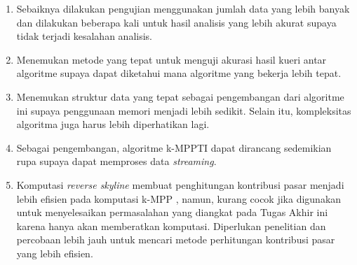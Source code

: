 \begin{enumerate}
	\item Sebaiknya dilakukan pengujian menggunakan jumlah data yang lebih banyak dan dilakukan beberapa kali untuk hasil analisis yang lebih akurat supaya tidak terjadi kesalahan analisis.
	\item Menemukan metode yang tepat untuk menguji akurasi hasil kueri antar algoritme supaya dapat diketahui mana algoritme yang bekerja lebih tepat.
	\item Menemukan struktur data yang tepat sebagai pengembangan dari algoritme ini supaya penggunaan memori menjadi lebih sedikit. Selain itu, kompleksitas algoritma juga harus lebih diperhatikan lagi.
	\item Sebagai pengembangan, algoritme k-MPPTI dapat dirancang sedemikian rupa supaya dapat memproses data \textit{streaming}.
	\item Komputasi \textit{reverse skyline} membuat penghitungan kontribusi pasar menjadi lebih efisien pada komputasi k-MPP \cite{kmpp}, namun, kurang cocok jika digunakan untuk menyelesaikan permasalahan yang diangkat pada Tugas Akhir ini karena hanya akan memberatkan komputasi. Diperlukan penelitian dan percobaan lebih jauh untuk mencari metode perhitungan kontribusi pasar yang lebih efisien.
\end{enumerate}



